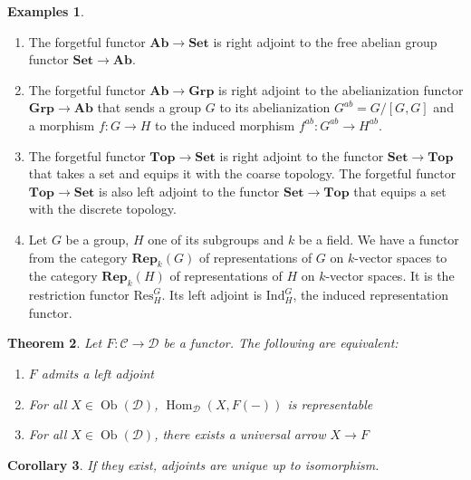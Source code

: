 \documentclass{article}
\newcommand{\cat}{\mathcal{C}}
\newcommand{\catt}{\mathcal{D}}
\newcommand{\Set}{\mathbf{Set}}
\newcommand{\Top}{\mathbf{Top}}
\newcommand{\Grp}{\mathbf{Grp}}
\newcommand{\Ab}{\mathbf{Ab}}
\newcommand{\Rep}{\mathbf{Rep}}
\DeclareMathOperator{\Ob}{Ob}
\DeclareMathOperator{\Hom}{Hom}
\theoremstyle{plain}
\newtheorem{theorem}{Theorem}[section]
\newtheorem{corollary}[theorem]{Corollary}
\theoremstyle{definition}
\newtheorem{examples}[theorem]{Examples}
\theoremstyle{remark}
\begin{document}
\begin{examples} \leavevmode
    \begin{enumerate} 
        \item The forgetful functor $\Ab \to \Set$ is right adjoint to the free abelian group functor $\Set \to \Ab$.
        \item The forgetful functor $\Ab \to \Grp$ is right adjoint to the abelianization functor $\Grp \to \Ab$ that sends a group $G$ to its abelianization $G^{ab} = G/[G,G]$ and a morphism $f : G \to H$ to the induced morphism $f^{ab} : G^{ab} \to H^{ab}$.
        \item The forgetful functor $\Top \to \Set$ is right adjoint to the functor $\Set \to \Top$ that takes a set and equips it with the coarse topology. The forgetful functor $\Top \to \Set$ is also left adjoint to the functor $\Set \to \Top$ that equips a set with the discrete topology.
        \item Let $G$ be a group, $H$ one of its subgroups and $k$ be a field. We have a functor from the category $\Rep_k(G)$ of representations of $G$ on $k$-vector spaces to the category $\Rep_k(H)$ of representations of $H$ on $k$-vector spaces. It is the restriction functor $\mathrm{Res}_H^G$. Its left adjoint is $\mathrm{Ind}_H^G$, the induced representation functor.
    \end{enumerate}
\end{examples}

\begin{theorem} \label{thmadjoints}
    Let $F : \cat \to \catt$ be a functor. The following are equivalent:
    \begin{enumerate}
        \item $F$ admits a left adjoint
        \item For all $X \in \Ob(\catt)$, $\Hom_\catt (X,F(-))$ is representable
        \item For all $X \in \Ob(\catt)$, there exists a universal arrow $X \to F$
    \end{enumerate}
\end{theorem}

\begin{corollary}
    If they exist, adjoints are unique up to isomorphism.
\end{corollary}
\end{document}
